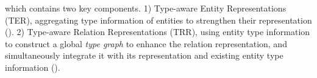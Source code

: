 \par {} %
which contains two key components. 1) Type-aware Entity Representations (TER), aggregating  type information of entities to strengthen their  representation (). 2) Type-aware Relation Representations (TRR), using entity type information to construct a global \textit{type graph} to enhance the relation representation, and simultaneously integrate it with its  representation and  existing entity type information ().
